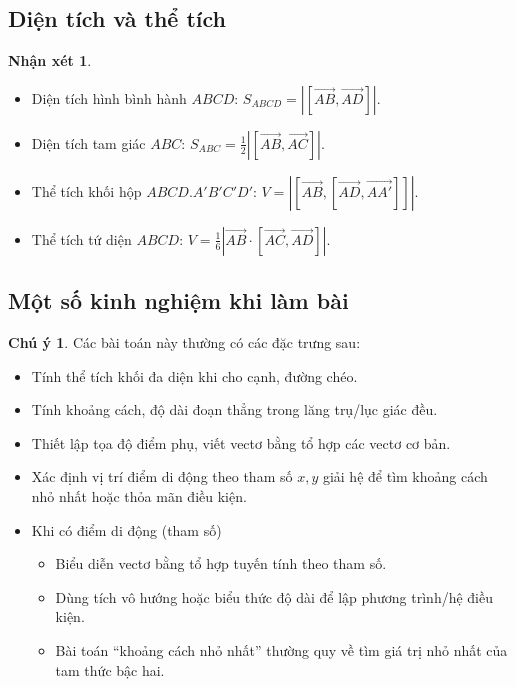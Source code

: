 \documentclass[12pt,a4paper,oneside]{book}
\theoremstyle{theorem}
\theoremstyle{definition}
\newtheorem{nx}[theorem2]{Nhận xét}
\newtheorem{cy}[theorem2]{Chú ý}
\begin{document}
    \subsection{Diện tích và thể tích}
    \begin{nx}
        \begin{itemize}
            \item Diện tích hình bình hành $ABCD$: $S_{ABCD}=\left|[\overrightarrow{AB},\overrightarrow{AD}]\right|.$
        
            \item Diện tích tam giác $ABC$: $S_{ABC}=\frac{1}{2}\left|[\overrightarrow{AB},\overrightarrow{AC}]\right|.$
        
            \item Thể tích khối hộp $ABCD.A'B'C'D'$: $V=\left|[\overrightarrow{AB},[\overrightarrow{AD},\overrightarrow{AA'}]]\right|.$
        
            \item Thể tích tứ diện $ABCD$: $V=\frac{1}{6}\left|\overrightarrow{AB}\cdot[\overrightarrow{AC},\overrightarrow{AD}]\right|.$
        \end{itemize}
    \end{nx}
    \subsection{Một số kinh nghiệm khi làm bài}
    \begin{cy}
        Các bài toán này thường có các đặc trưng sau:
        \begin{itemize}
            \item Tính thể tích khối đa diện khi cho cạnh, đường chéo.
        \end{itemize}
        \begin{itemize}
            \item Tính khoảng cách, độ dài đoạn thẳng trong lăng trụ/lục giác đều.
            
            \item Thiết lập tọa độ điểm phụ, viết vectơ bằng tổ hợp các vectơ cơ bản.
            
            \item Xác định vị trí điểm di động theo tham số $x,y$ giải hệ để tìm khoảng cách nhỏ nhất hoặc thỏa mãn điều kiện.
            
            \item Khi có điểm di động (tham số)
            \begin{itemize}
                \item Biểu diễn vectơ bằng tổ hợp tuyến tính theo tham số.
                \item Dùng tích vô hướng hoặc biểu thức độ dài để lập phương trình/hệ điều kiện.
                \item Bài toán ``khoảng cách nhỏ nhất'' thường quy về tìm giá trị nhỏ nhất của tam thức bậc hai.
            \end{itemize}
            \end{itemize}
    \end{cy}
\end{document}
